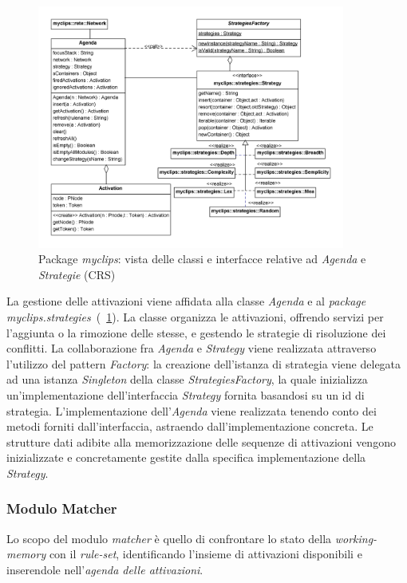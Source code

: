 \begin{figure}
\centering
\includegraphics[width=0.9\textwidth]{Immagini/Capitolo3/Classi/myclips_Agenda-Strategies.png}
\caption{Package \emph{myclips}: vista delle classi e interfacce relative ad  \emph{Agenda} e \emph{Strategie} (CRS)}\label{fig:class-myclips-agenda-strategies}
\end{figure}

La gestione delle attivazioni viene affidata alla classe \emph{Agenda} e al \emph{package} \emph{myclips.strategies}~(\figurename~\ref{fig:class-myclips-agenda-strategies}). La classe organizza le attivazioni, offrendo servizi per l'aggiunta o la rimozione delle stesse, e gestendo le strategie di risoluzione dei conflitti. La collaborazione fra \emph{Agenda} e \emph{Strategy} viene realizzata attraverso l'utilizzo del pattern \emph{Factory}: la creazione dell'istanza di strategia viene delegata ad una istanza \emph{Singleton} della classe \emph{StrategiesFactory}, la quale inizializza un'implementazione dell'interfaccia \emph{Strategy} fornita basandosi su un id di strategia. L'implementazione dell'\emph{Agenda} viene realizzata tenendo conto dei metodi forniti dall'interfaccia, astraendo dall'implementazione concreta. Le strutture dati adibite alla memorizzazione delle sequenze di attivazioni vengono inizializzate e concretamente gestite dalla specifica implementazione della \emph{Strategy}.

\clearpage


\subsubsection{Modulo Matcher}
Lo scopo del modulo \emph{matcher} è quello di confrontare lo stato della \emph{working-memory} con il \emph{rule-set}, identificando l'insieme di attivazioni disponibili e inserendole nell'\emph{agenda delle attivazioni}.

